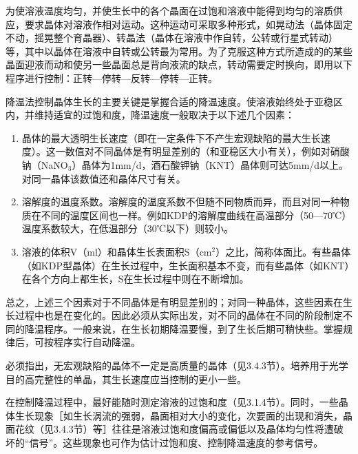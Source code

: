 为使溶液温度均匀，并使生长中的各个晶面在过饱和溶液中能得到均匀的溶质供应，要求晶体对溶液作相对运动。这种运动可采取多种形式，如晃动法（晶体固定不动，摇晃整个育晶器）、转晶法（晶体在溶液中作自转，公转或行星式转动）等，其中以晶体在溶液中自转或公转最为常用。为了克服这种方式所造成的的某些晶面迎液而动和使另一些晶面总是背向液流的缺点，转动需要定时换向，即用以下程序进行控制：正转---停转---反转---停转---正转。

降温法控制晶体生长的主要关键是掌握合适的降温速度。使溶液始终处于亚稳区内，并维持适宜的过饱和度，降温速度一般取决于以下述几个因素：
\begin{enumerate}[(1)]\itemsep -0.5ex
\item 晶体的最大透明生长速度（即在一定条件下不产生宏观缺陷的最大生长速度）。这一数值对不同晶体是有明显差别的（和亚稳区大小有关），例如对硝酸钠（NaNO$_3$）晶体为1mm/d，酒石酸钾钠（KNT）晶体则可达5mm/d以上。对同一晶体该数值还和晶体尺寸有关。
\item 溶解度的温度系数。溶解度的温度系数不但随不同物质而异，而且对同一种物质在不同的温度区间也一样。例如KDP的溶解度曲线在高温部分（50---70℃）温度系数较大，在低温部分（30℃以下）则较小。
\item 溶液的体积V（ml）和晶体生长表面积S（cm$^2$）之比，简称体面比。有些晶体（如KDP型晶体）在生长过程中，生长面积基本不变，而有些晶体（如KNT）在各个方向上都生长，S在生长过程中则在不断增加。
\end{enumerate}

总之，上述三个因素对于不同晶体是有明显差别的；对同一种晶体，这些因素在生长过程中也是在变化的。因此必须从实际出发，对不同的晶体在不同的阶段制定不同的降温程序。一般来说，在生长初期降温要慢，到了生长后期可稍快些。掌握规律后，可按程序实行自动降温。

必须指出，无宏观缺陷的晶体不一定是高质量的晶体（见3.4.3节）。培养用于光学目的高完整性的单晶，其生长速度应当控制的更小一些。

在控制降温过程中，最好能随时测定溶液的过饱和度（见3.1.4节）。同时，一些晶体生长现象［如生长涡流的强弱，晶面相对大小的变化，次要面的出现和消失，晶面花纹（见3.4.3节）等］往往是溶液过饱和度偏高或偏低以及晶体均匀性将遭破坏的“信号”。这些现象也可作为估计过饱和度、控制降温速度的参考信号。
